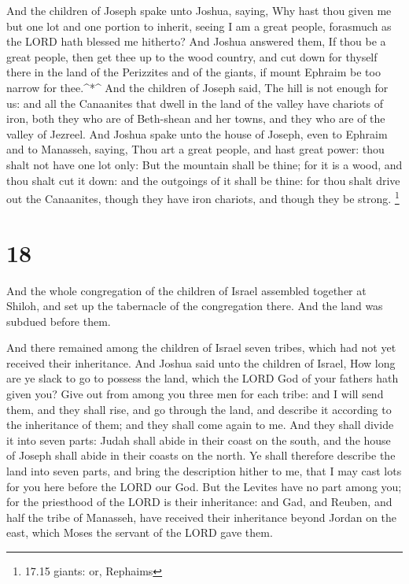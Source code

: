  And the children of Joseph spake unto Joshua, saying, Why
hast thou given me but one lot and one portion to inherit, seeing I am a
great people, forasmuch as the LORD hath blessed me hitherto?
 And Joshua answered them, If thou be a great people, then
get thee up to the wood country, and cut down for thyself there in the
land of the Perizzites and of the giants, if mount Ephraim be too narrow
for thee.\^{}*\^{}  And the children of Joseph said, The
hill is not enough for us: and all the Canaanites that dwell in the land
of the valley have chariots of iron, both they who are of Beth-shean and
her towns, and they who are of the valley of Jezreel.  And
Joshua spake unto the house of Joseph, even to Ephraim and to Manasseh,
saying, Thou art a great people, and hast great power: thou shalt not
have one lot only:  But the mountain shall be thine; for it
is a wood, and thou shalt cut it down: and the outgoings of it shall be
thine: for thou shalt drive out the Canaanites, though they have iron
chariots, and though they be strong. \footnote{17.15 giants: or,
  Rephaims}

\hypertarget{section-17}{%
\section{18}\label{section-17}}

 And the whole congregation of the children of Israel
assembled together at Shiloh, and set up the tabernacle of the
congregation there. And the land was subdued before them.

 And there remained among the children of Israel seven
tribes, which had not yet received their inheritance.  And
Joshua said unto the children of Israel, How long are ye slack to go to
possess the land, which the LORD God of your fathers hath given you?
 Give out from among you three men for each tribe: and I
will send them, and they shall rise, and go through the land, and
describe it according to the inheritance of them; and they shall come
again to me.  And they shall divide it into seven parts:
Judah shall abide in their coast on the south, and the house of Joseph
shall abide in their coasts on the north.  Ye shall
therefore describe the land into seven parts, and bring the description
hither to me, that I may cast lots for you here before the LORD our God.
 But the Levites have no part among you; for the priesthood
of the LORD is their inheritance: and Gad, and Reuben, and half the
tribe of Manasseh, have received their inheritance beyond Jordan on the
east, which Moses the servant of the LORD gave them.

